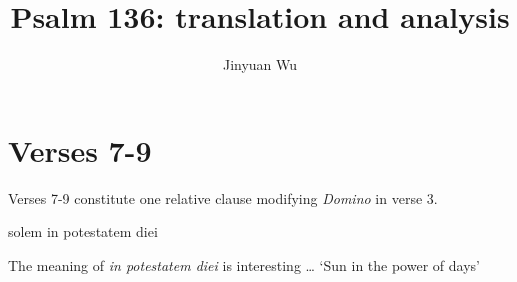 \documentclass[a4paper, 12pt]{article}
\title{Psalm 136: translation and analysis}
\author{Jinyuan Wu}
\newcommand{\form}[1]{\emph{#1}}
\newcommand{\translate}[1]{`#1'}
\begin{document}
\maketitle

\section{Verses 7-9}

Verses 7-9 constitute one relative clause modifying \form{Domino} in verse 3.

\begin{exe}
    \ex solem in potestatem diei 
\end{exe}

The meaning of \form{in potestatem diei} is interesting \dots
\translate{Sun in the power of days}
\end{document}
